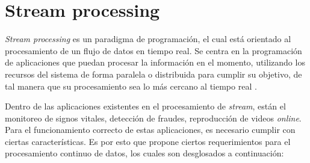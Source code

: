 \section{Stream processing}
\label{sec:streamProcessing}

\textit{Stream processing} es un paradigma de programación, el cual está orientado al procesamiento de un flujo de datos en tiempo real. Se centra en la programación de aplicaciones que puedan procesar la información en el momento, utilizando los recursos del sistema de forma paralela o distribuida para cumplir su objetivo, de tal manera que su procesamiento sea lo más cercano al tiempo real \citep{ChakravarthyJ09}.

Dentro de las aplicaciones existentes en el procesamiento de \textit{stream}, están el monitoreo de signos vitales, detección de fraudes, reproducción de videos \textit{online}. Para el funcionamiento correcto de estas aplicaciones, es necesario cumplir con ciertas características. Es por esto que propone \citep{andrade2014fundamentals} ciertos requerimientos para el procesamiento continuo de datos, los cuales son desglosados a continuación:

